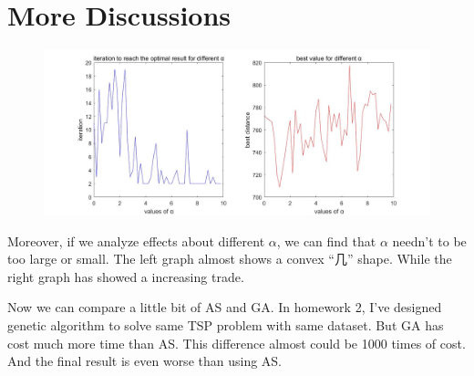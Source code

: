 \documentclass{article}
\begin{document}
\section{More Discussions}
\begin{figure}[htbp]
    \centering
    \includegraphics[scale=0.25]{3.jpg}
\end{figure}
\par   
Moreover, if we analyze effects about different $\alpha$, 
we can find that $\alpha$ needn't to be too large or small.
The left graph almost shows a convex ``几'' shape.
While the right graph has showed a increasing trade.
\par
Now we can compare a little bit of AS and GA.
In homework 2, I've designed genetic algorithm to solve same TSP problem with same dataset.
But GA has cost much more time than AS.
This difference almost could be 1000 times of cost.
And the final result is even worse than using AS.
\end{document}

